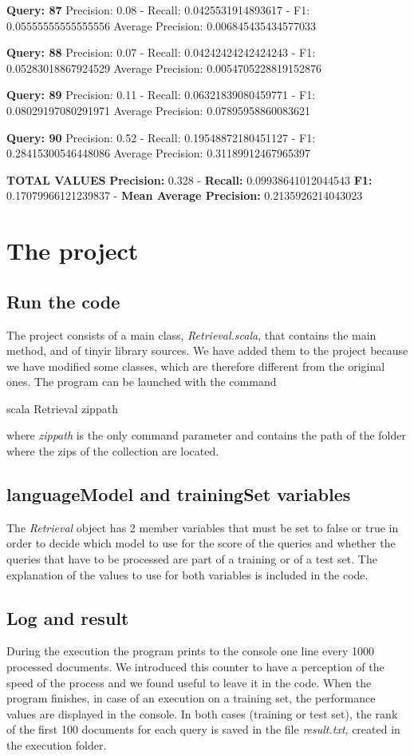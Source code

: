 \documentclass[a4paper, 11pt]{article}
\begin{document}
\textbf{Query: 87}
Precision: 0.08 - Recall: 0.0425531914893617 - F1: 0.05555555555555556 Average Precision: 0.006845435434577033

\textbf{Query: 88}
Precision: 0.07 - Recall: 0.04242424242424243 - F1: 0.05283018867924529 Average Precision: 0.0054705228819152876

\textbf{Query: 89}
Precision: 0.11 - Recall: 0.06321839080459771 - F1: 0.08029197080291971 Average Precision: 0.07895958860083621

\textbf{Query: 90}
Precision: 0.52 - Recall: 0.19548872180451127 - F1: 0.28415300546448086 Average Precision: 0.31189912467965397

\textbf{TOTAL VALUES}
\textbf{Precision: } 0.328 - \textbf{Recall:} 0.09938641012044543 \textbf{F1: } 0.17079966121239837 - \textbf{Mean Average Precision: } 0.2135926214043023


\section{The project}

\subsection{Run the code}
The project consists of a main class, \textit{Retrieval.scala}, that contains the main method, and of tinyir library sources. We have added them to the project because we have modified some classes, which are therefore different from the original ones.
The program can be launched with the command

scala Retrieval zippath

where \textit{zippath} is the only command parameter and contains the path of the folder where the zips of the collection are located.

\subsection{languageModel and trainingSet variables}
The \textit{Retrieval} object has 2 member variables that must be set to false or true in order to decide which model to use for the score of the queries and whether the queries 
that have to be processed are part of a training or of a test set. The explanation of the values to use for both variables is included in the code.

\subsection{Log and result}
During the execution the program prints to the console one line every 1000 processed documents. We introduced this counter to have a perception of the speed of the process and we found useful to leave it in the code. When the program finishes, in case of an execution on a training set, the performance values are displayed in the console. In both cases (training or test set), the rank of the first 100 documents for each query is saved in the file \textit{result.txt}, created in the execution folder.
\end{document}
